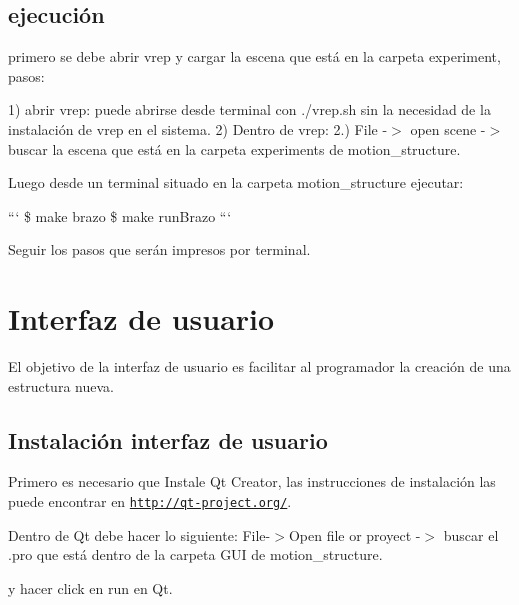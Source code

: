 \subsection*{ejecución }

primero se debe abrir vrep y cargar la escena que está en la carpeta experiment, pasos\-:

1) abrir vrep\-: puede abrirse desde terminal con ./vrep.sh sin la necesidad de la instalación de vrep en el sistema. 2) Dentro de vrep\-: 2.) File -\/$>$ open scene -\/$>$ buscar la escena que está en la carpeta experiments de motion\-\_\-structure.

Luego desde un terminal situado en la carpeta motion\-\_\-structure ejecutar\-:

``` \$ make brazo \$ make run\-Brazo ```

Seguir los pasos que serán impresos por terminal.

\section*{Interfaz de usuario }

El objetivo de la interfaz de usuario es facilitar al programador la creación de una estructura nueva.

\subsection*{Instalación interfaz de usuario }

Primero es necesario que Instale Qt Creator, las instrucciones de instalación las puede encontrar en \href{http://qt-project.org/}{\tt http\-://qt-\/project.\-org/}.

Dentro de Qt debe hacer lo siguiente\-: File-\/$>$Open file or proyect -\/$>$ buscar el .pro que está dentro de la carpeta G\-U\-I de motion\-\_\-structure.

y hacer click en run en Qt. 